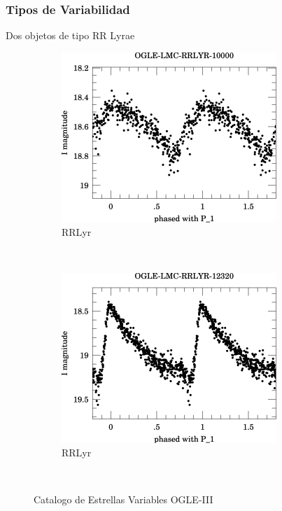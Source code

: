 \documentclass{beamer}
\begin{document}
\begin{frame}
  \frametitle{Tipos de Variabilidad}
  Dos objetos de tipo RR Lyrae
  \begin{figure}
    \centering
    \begin{subfigure}[b]{0.4\textwidth}
      \includegraphics[width=\textwidth]{./img/OGLE-LMC-RRLYR-10000_1.jpg}
      \caption{RRLyr}
    \end{subfigure}%
    ~ %
    \begin{subfigure}[b]{0.4\textwidth}
      \includegraphics[width=\textwidth]{./img/OGLE-LMC-RRLYR-12320_1.jpg}
      \caption{RRLyr}
    \end{subfigure}
    ~ %
    \caption{Catalogo de Estrellas Variables OGLE-III}
  \end{figure}
\end{frame}
\end{document}
